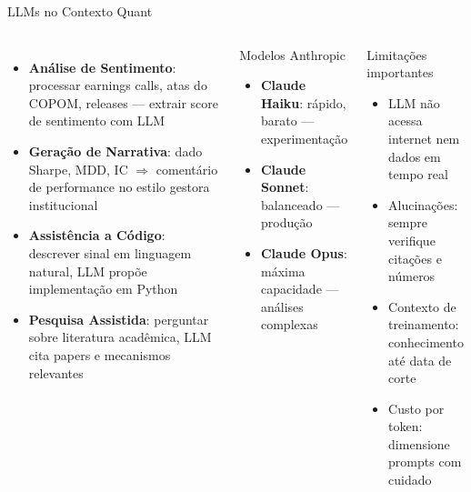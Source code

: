 \documentclass[aspectratio=169,12pt]{beamer}
\begin{document}
\begin{frame}[fragile]{LLMs no Contexto Quant}
\begin{columns}[T]
\begin{itemize}
  \item \textbf{Análise de Sentimento}: processar earnings calls, atas do COPOM, releases — extrair score de sentimento com LLM
  \item \textbf{Geração de Narrativa}: dado Sharpe, MDD, IC $\Rightarrow$ comentário de performance no estilo gestora institucional
  \item \textbf{Assistência a Código}: descrever sinal em linguagem natural, LLM propõe implementação em Python
  \item \textbf{Pesquisa Assistida}: perguntar sobre literatura acadêmica, LLM cita papers e mecanismos relevantes
\end{itemize}
\begin{block}{Modelos Anthropic}
\begin{itemize}
  \item \textbf{Claude Haiku}: rápido, barato — experimentação
  \item \textbf{Claude Sonnet}: balanceado — produção
  \item \textbf{Claude Opus}: máxima capacidade — análises complexas
\end{itemize}
\end{block}\vspace{.3em}
\begin{alertblock}{Limitações importantes}
\begin{itemize}
  \item LLM não acessa internet nem dados em tempo real
  \item Alucinações: sempre verifique citações e números
  \item Contexto de treinamento: conhecimento até data de corte
  \item Custo por token: dimensione prompts com cuidado
\end{itemize}
\end{alertblock}
\end{columns}
\end{frame}
\end{document}
